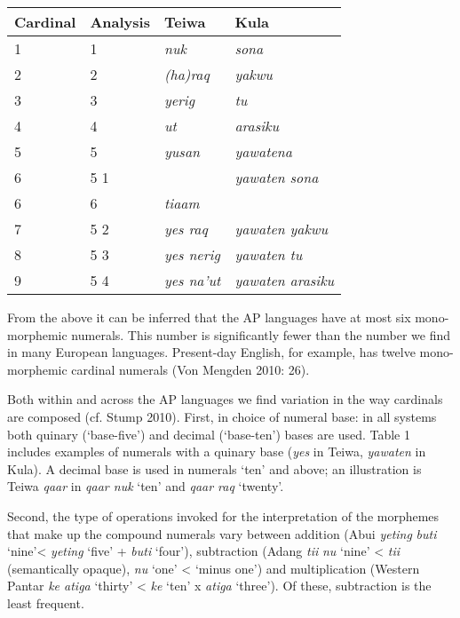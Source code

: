 \begin{flushleft}
\tablehead{}
\begin{supertabular}{m{0.72815984in}m{0.7219598in}m{1.0344598in}m{1.1906599in}}
\hline
\textbf{Cardinal} &
\textbf{Analysis} &
\textbf{Teiwa} &
\textbf{Kula}\\ &
1 &
\textit{nuk} &
\textit{sona}\\
2 &
2 &
\textit{(ha)raq} &
\textit{yakwu}\\
3 &
3 &
\textit{yerig} &
\textit{tu}\\
4 &
4 &
\textit{ut} &
\textit{arasiku}\\
5 &
5 &
\textit{yusan} &
\textit{yawatena}\\
6 &
5  1 &
 &
\textit{yawaten sona}\\
6 &
6 &
\textit{tiaam} &
\\
7  &
5  2 &
\textit{yes raq} &
\textit{yawaten yakwu}\\
8  &
5  3 &
\textit{yes nerig} &
\textit{yawaten tu}\\
9 &
5  4 &
\textit{yes na{\textquoteright}ut} &
\textit{yawaten arasiku}\\\hline
\end{supertabular}
\end{flushleft}
From the above it can be inferred that the AP languages have at most six mono-morphemic numerals. This number is significantly fewer than the number we find in many European languages. Present-day English, for example, has twelve mono-morphemic cardinal numerals (Von Mengden 2010: 26). 

Both within and across the AP languages we find variation in the way cardinals are composed (cf. Stump 2010). First, in choice of numeral base: in all systems both quinary ({\textquoteleft}base-five{\textquoteright}) and decimal ({\textquoteleft}base-ten{\textquoteright}) bases are used. Table 1 includes examples of numerals with a quinary base (\textit{yes }in Teiwa, \textit{yawaten }in Kula). A decimal base is used in numerals {\textquoteleft}ten{\textquoteright} and above; an illustration is Teiwa \textit{qaar }in \textit{qaar nuk} {\textquoteleft}ten{\textquoteright} and \textit{qaar raq} {\textquoteleft}twenty{\textquoteright}. 

Second, the type of operations invoked for the interpretation of the morphemes that make up the compound numerals vary between addition (Abui \textit{yeting}\textit{ }\textit{buti} {\textquoteleft}nine{\textquoteright}{\textless} \textit{yeting}\textit{ }{\textquoteleft}five{\textquoteright} + \textit{buti} {\textquoteleft}four{\textquoteright}), subtraction (Adang  \textit{ti}\textit{{\textglotstop}}\textit{i }\textit{nu} {\textquoteleft}nine{\textquoteright} {\textless} \textit{ti}\textit{{\textglotstop}}\textit{i }(semantically opaque), \textit{nu} {\textquoteleft}one{\textquoteright} {\textless} {\textquoteleft}minus one{\textquoteright}) and multiplication (Western Pantar \textit{ke atiga }{\textquoteleft}thirty{\textquoteright} {\textless} \textit{ke }{\textquoteleft}ten{\textquoteright} x \textit{atiga }{\textquoteleft}three{\textquoteright}). Of these, subtraction is the least frequent.

